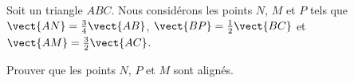 
\begin{exercice}\label{exosmath-0054}

    Soit un triangle \( ABC\). Nous considérons les points \( N\), \( M\) et \( P\) tels que \( \vect{ AN }=\frac{ 3 }{ 4 }\vect{AB}\), \( \vect{BP}=\frac{ 1 }{2}\vect{BC}\) et \( \vect{AM}=\frac{ 3 }{2}\vect{AC}\).

    Prouver que les points \( N\), \( P\) et \( M\) sont alignés.

\end{exercice}
